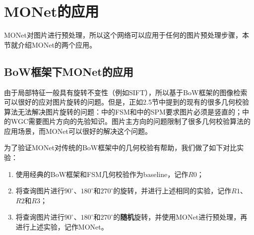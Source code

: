 \section{MONet的应用}
MONet对图片进行预处理，所以这个网络可以应用于任何的图片预处理步骤，本节就介绍MONet的两个应用。

\subsection{BoW框架下MONet的应用}
由于局部特征一般具有旋转不变性（例如SIFT\cite{lowe2004distinctive}），所以基于BoW框架的图像检索可以很好的应对图片旋转的问题。但是，正如2.5节中提到的现有的很多几何校验算法无法解决图片旋转的问题：\cite{philbin2007object}中的FSM和\cite{lazebnik2006beyond}中的SPM要求图片必须是竖直的；\cite{jegou2008hamming}中的WGC需要图片方向的先验知识。图片主方向的问题限制了很多几何校验算法的应用场景，而MONet可以很好的解决这个问题。

为了验证MONet对传统的BoW框架中的几何校验有帮助，我们做了如下对比实验：
\begin{enumerate}
	\item 使用经典的BoW框架和FSM\cite{philbin2007object}几何校验作为baseline，记作$R0$；
	\item 将查询图片进行$90^{\circ}$、$180^{\circ}$和$270^{\circ}$的旋转，并进行上述相同的实验，记作$R1$、$R2$和$R3$；
	\item 将查询图片进行$90^{\circ}$、$180^{\circ}$和$270^{\circ}$的\textbf{随机}旋转，并使用MONet进行预处理，再进行上述实验，记作MONet。
\end{enumerate}


